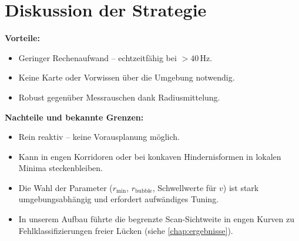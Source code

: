 \section{Diskussion der Strategie}
\label{sec:ftg_discussion}

\textbf{Vorteile:}
\begin{itemize}
  \item Geringer Rechenaufwand – echtzeitfähig bei $>40\,\text{Hz}$.
  \item Keine Karte oder Vorwissen über die Umgebung notwendig.
  \item Robust gegenüber Messrauschen dank Radiusmittelung.
\end{itemize}

\textbf{Nachteile und bekannte Grenzen:}
\begin{itemize}
  \item Rein reaktiv -- keine Vorausplanung möglich.
  \item Kann in engen Korridoren oder bei konkaven Hindernisformen
        in lokalen Minima steckenbleiben.
  \item Die Wahl der Parameter (\(r_{\min}\), \(r_{\text{bubble}}\),
        Schwellwerte für \(v\)) ist stark umgebungsabhängig und
        erfordert aufwändiges Tuning.
  \item In unserem Aufbau führte die begrenzte Scan-Sichtweite in
        engen Kurven zu Fehlklassifizierungen freier Lücken
        (siehe \cref{chap:ergebnisse}).
\end{itemize}
